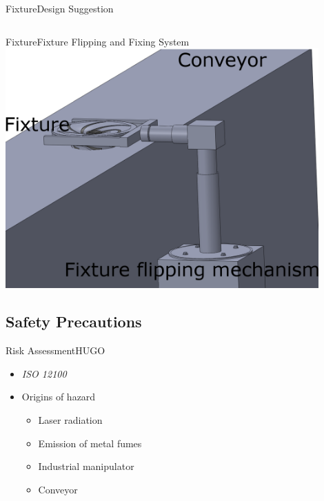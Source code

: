 \begin{frame}{Fixture}{Design Suggestion}
\begin{columns}
\end{columns}
\end{frame}

\begin{frame}{Fixture}{Fixture Flipping and Fixing System}
 \centering
    \includegraphics[width=0.9\textwidth]{graphics/andrej/fixture_flipping_mechanism}
\end{frame}















\subsection{Safety Precautions}
\begin{frame}{Risk Assessment}{HUGO}
\begin{itemize}
    \item \textit{ISO 12100}
    \item Origins of hazard
        \begin{itemize}
            \item Laser radiation
            \item Emission of metal fumes
            \item Industrial manipulator
            \item Conveyor 
        \end{itemize}
    \end{itemize}
\end{frame}

